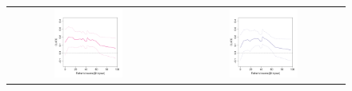 \documentclass[aos]{imsart}
\theoremstyle{plain}
\theoremstyle{definition}
\theoremstyle{remark}
\newcommand{\FIGW}{0.45}
\begin{document}
\begin{CJK}{UTF8}{gbsn}
{\begin{figure}
\centering
\begin{tabular}{ccc}
\includegraphics[width=\FIGW\textwidth]{familysize_18.pdf} & &
\includegraphics[width=\FIGW\textwidth]{familysize_22.pdf} \\

\end{tabular}
\end{figure}}
\end{CJK}
\end{document}
